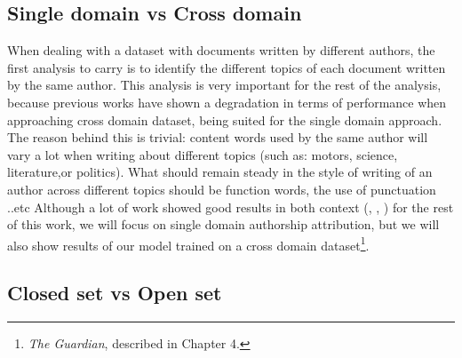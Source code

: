 \subsection{Single domain vs Cross domain}

When dealing with a dataset with documents written by different authors, the first analysis to carry is to identify the different topics of each document written by the same author. This analysis is very important for the rest of the analysis, because previous works have shown a degradation in terms of performance when approaching cross domain dataset, being suited for the single domain approach.
The reason behind this is trivial: content words used by the same author will vary a lot when writing about different topics (such as: motors, science, literature,or politics). What should remain steady in the style of writing of an author across different topics should be function words, the use of punctuation ..etc
Although a lot of work showed good results in both context (\cite{sapkota2015not}, \cite{kestemont2019overview}, \cite{overdorf2016blogs}) for the rest of this work, we will focus on single domain authorship attribution, but we will also show results of our model trained on a cross domain dataset\footnote{\textit{The Guardian}, described in Chapter 4.}. 

\subsection{Closed set vs Open set}

